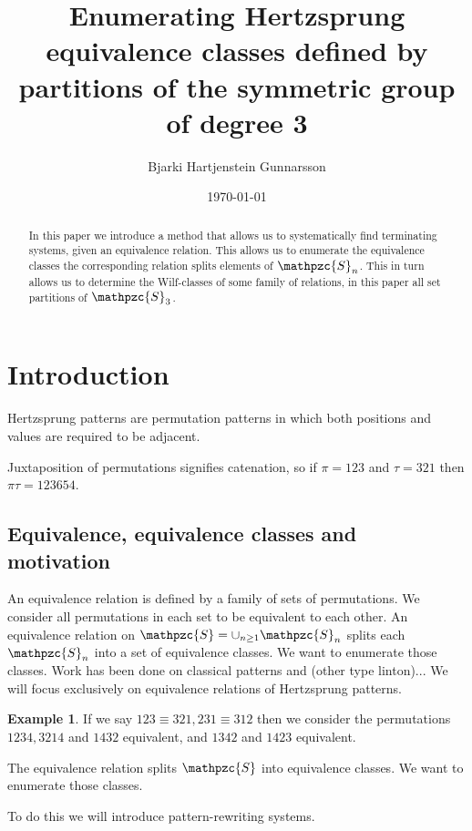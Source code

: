\documentclass[a4paper, 11pt]{article}
\theoremstyle{definition}
\newtheorem{example}[theorem]{Example}
\newcommand{\Sym}{\mathpzc{S}}
\begin{document}
\title{Enumerating Hertzsprung equivalence classes defined by partitions of the symmetric group of degree 3}
\author{Bjarki Hartjenstein Gunnarsson}
\date{\today}
\maketitle

\begin{abstract}
    In this paper we introduce a method that allows us to systematically find
    terminating systems, given an equivalence relation. This allows us to
    enumerate the equivalence classes the corresponding relation splits
    elements of $\Sym_n$. This in turn allows us to determine the Wilf-classes
    of some family of relations, in this paper all set partitions of $\Sym_3$.
\end{abstract}

\section{Introduction}
Hertzsprung patterns are permutation patterns in which both positions and values are
required to be adjacent.

Juxtaposition of permutations signifies catenation, so if $\pi=123$ and
$\tau=321$ then $\pi\tau=123654$.

\subsection{Equivalence, equivalence classes and motivation}
An equivalence relation is defined by a family of sets of permutations. We
consider all permutations in each set to be equivalent to each other. An
equivalence relation on $\Sym = \cup_{n \geq 1} \Sym_n$ splits each $\Sym_n$
into a set of equivalence classes.  We want to enumerate those classes.  Work
has been done on classical patterns and (other type linton)...  We will focus
exclusively on equivalence relations of Hertzsprung patterns. 

\begin{example}
    If we say $123 \equiv 321, 231 \equiv 312$ then we consider the permutations
    $1234, 3214$ and $1432$ equivalent, and $1342$ and $1423$ equivalent.
\end{example}

The equivalence relation splits $\Sym$ into equivalence classes. We want to
enumerate those classes.

To do this we will introduce pattern-rewriting systems.
\end{document}
